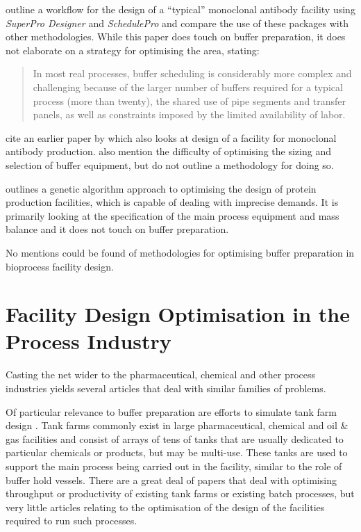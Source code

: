 \citet{Petrides:2014} outline a workflow for 
the design of a ``typical'' monoclonal antibody facility using 
\emph{SuperPro Designer\textsuperscript{\textregistered}} and
\emph{SchedulePro\textsuperscript{\textregistered}} and compare the use of
these packages with other methodologies.
While this paper does touch on buffer preparation,
it does not elaborate on a strategy for optimising the area, stating:
\begin{quote}In most real processes, buffer scheduling is considerably more
complex and challenging because of the larger number of buffers required for a
typical process (more than twenty), the shared use of pipe segments and transfer
panels, as well as constraints imposed by the limited availability of labor.
\end{quote}
\citet{Petrides:2014} cite an earlier paper by \citet{Toumi:2010} which also
looks at design of a facility for monoclonal antibody production.
\citet{Toumi:2010} also mention the difficulty of optimising the sizing and 
selection of buffer equipment, but do not outline a methodology for doing so.

\citet{Dietz:2008} outlines a genetic algorithm approach to optimising the 
design of protein production facilities, which is capable of dealing with
imprecise demands.  It is primarily looking at the specification of the main
process equipment and mass balance and it does not touch on buffer preparation.

No mentions could be found of methodologies for optimising buffer preparation in
bioprocess facility design.

\section{Facility Design Optimisation in the Process Industry}
\label{SS.fdopi}
Casting the net wider to the pharmaceutical, chemical and other process
industries yields several articles that deal with similar families of problems.

Of particular relevance to buffer preparation are efforts to simulate tank farm
design \citep{Al-Otaibi:2004, Stewart:2005, Sharda:2009, Terrazas-Moreno:2012}.
Tank farms commonly exist in large pharmaceutical, chemical and oil \&
gas facilities and consist of arrays of tens of tanks that are usually dedicated
to particular chemicals or products, but may be multi-use.  These tanks are used
to support the main process being carried out in the facility, similar to the
role of buffer hold vessels.  There are a great deal of papers that deal with
optimising throughput or productivity of existing tank farms or existing batch
processes, but very little articles relating to the optimisation of the design
of the facilities required to run such processes.

